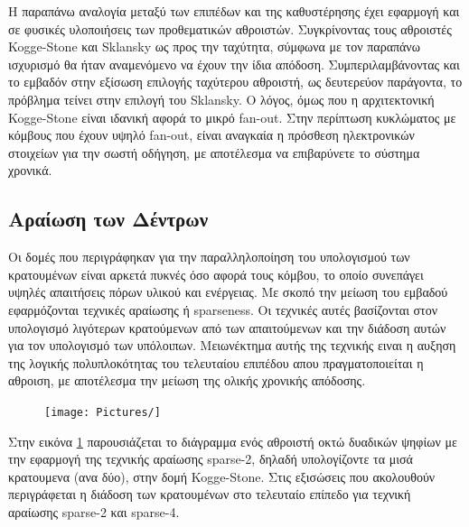 Η παραπάνω αναλογία μεταξύ των επιπέδων και της καθυστέρησης έχει εφαρμογή και σε φυσικές
υλοποιήσεις των προθεματικών αθροιστών. Συγκρίνοντας τους αθροιστές Kogge-Stone και Sklansky ως
προς την ταχύτητα, σύμφωνα με τον παραπάνω ισχυρισμό θα ήταν αναμενόμενο να έχουν την ίδια 
απόδοση. Συμπεριλαμβάνοντας και το εμβαδόν στην εξίσωση επιλογής ταχύτερου αθροιστή, ως δευτερεύον
παράγοντα, το πρόβλημα τείνει στην επιλογή του Sklansky. Ο λόγος, όμως που η αρχιτεκτονική 
Kogge-Stone είναι ιδανική αφορά το μικρό fan-out. Στην περίπτωση κυκλώματος με κόμβους
που έχουν υψηλό fan-out, είναι αναγκαία η πρόσθεση ηλεκτρονικών στοιχείων για την σωστή οδήγηση,
με αποτέλεσμα να επιβαρύνετε το σύστημα χρονικά.














\subsection{Αραίωση των Δέντρων}
\label{subsection:prefix_sparseness}
Οι δομές που περιγράφηκαν για την παραλληλοποίηση του υπολογισμού των κρατουμένων 
είναι αρκετά πυκνές όσο αφορά τους κόμβου, το οποίο συνεπάγει υψηλές απαιτήσεις πόρων υλικού και ενέργειας. Με σκοπό την μείωση του εμβαδού εφαρμόζονται τεχνικές αραίωσης ή sparseness. Οι τεχνικές αυτές βασίζονται στον υπολογισμό λιγότερων κρατούμενων από των απαιτούμενων και την διάδοση αυτών για τον υπολογισμό των υπόλοιπων. Μειωνέκτημα αυτής της τεχνικής ειναι η αυξηση της λογικής πολυπλοκότητας του τελευταίου επιπέδου απου πραγματοποιείται η αθροιση, με αποτέλεσμα την μείωση της ολικής χρονικής απόδοσης.

\begin{figure}[H]
    \centering
    \texttt{[image: Pictures/]}
    \caption{}
    \label{}
\end{figure}

Στην εικόνα \ref{} παρουσιάζεται το διάγραμμα ενός αθροιστή οκτώ δυαδικών ψηφίων με την εφαρμογή της τεχνικής αραίωσης sparse-2, δηλαδή υπολογίζοντε τα μισά κρατουμενα (ανα δύο), στην δομή Kogge-Stone.
Στις εξισώσεις που ακολουθούν περιγράφεται η διάδοση των κρατουμένων στο τελευταίο επίπεδο για τεχνική αραίωσης sparse-2 και sparse-4.

